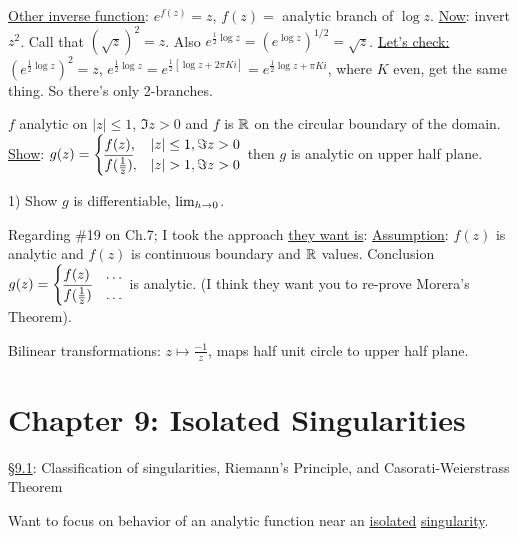 \documentclass[]{article}
\begin{document}
\underline{Other inverse function}: $e^{f(z)} = z$, $f(z) = $ analytic branch of $\log{z}$.
\underline{Now}: invert $z^2$. Call that $(\sqrt{z})^2 = z$. Also $e^{\frac{1}{2}\log{z}} = \left(e^{\log{z}}\right)^{1/2} = \sqrt{z}$. \underline{Let's check:} $\left( e^{\frac{1}{2}\log{z}} \right)^2 = z$, $e^{\frac{1}{2}\log{z}} = e^{\frac{1}{2}\left[ \log{z} + 2\pi Ki\right]} = e^{\frac{1}{2}\log{z} + \pi Ki}$, where $K$ even, get the same thing. So there's only 2-branches.

\begin{example}
	[HW \#19, Ch.7] $f$ analytic on $|z|\leq 1$, $\Im z > 0$ and $f$ is $\mathbb{R}$ on the circular boundary of the domain. \underline{Show}: $g(z) = \begin{cases} f(z), & |z|\leq 1, \Im z>0 \\ \conj{f(\frac{1}{\conj{z}})}, & |z|> 1, \Im z > 0 \end{cases}$ then $g$ is analytic on upper half plane.
	
	1) Show $g$ is differentiable, $\lim_{h\rightarrow 0}$. 
\end{example}


Regarding \#19 on Ch.7; I took the approach \underline{they want is}: \underline{Assumption}: $f(z)$ is analytic and $f(z)$ is continuous boundary and $\mathbb{R}$ values. Conclusion $g(z) = \begin{cases} f(z) & \dots \\ \overline{f(\frac{1}{\overline{z}})} & \dots \end{cases}$ is analytic. (I think they want you to re-prove Morera's Theorem).

Bilinear transformations: $z\mapsto \frac{-1}{z}$, maps half unit circle to upper half plane.

\section*{Chapter 9: Isolated Singularities}

\underline{\S9.1}: Classification of singularities, Riemann's Principle, and Casorati-Weierstrass Theorem

Want to focus on behavior of an analytic function near an \underline{isolated} \underline{singularity}.
\end{document}
